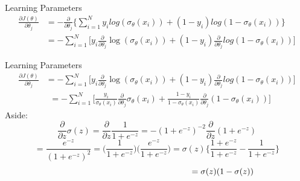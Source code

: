 \documentclass{beamer}
\begin{document}
\begin{frame}{Learning Parameters}
\begin{align*}
\frac{\partial J(\theta)}{\partial \theta_{j}} &= -\frac{\partial }{\partial \theta_{j}} \bigg\{\sum_{i=1}^{N} y_{i} log(\sigma_{\theta}(x_{i})) + (1 - y_{i})log(1 - \sigma_{\theta}(x_{i}))\bigg\} \\
&= -\sum_{i=1}^{N}\bigg[y_{i}\frac{\partial}{\partial \theta_{j}} \log(\sigma_{\theta}(x_{i})) + (1-y_{i})\frac{\partial}{\partial \theta_{j}} log(1 - \sigma_{\theta}(x_{i}))\bigg]
\end{align*}
\end{frame}
\begin{frame}{Learning Parameters}
\begin{align*}
\frac{\partial J(\theta)}{\partial \theta_{j}} &= -\sum_{i=1}^{N}\bigg[y_{i}\frac{\partial}{\partial \theta_{j}} \log(\sigma_{\theta}(x_{i})) + (1-y_{i})\frac{\partial}{\partial \theta_{j}} log(1 - \sigma_{\theta}(x_{i}))\bigg]
\end{align*}
\begin{align}
&= -\sum_{i=1}^{N}\bigg[\frac{y_{i}}{\sigma_{\theta}(x_{i})} \frac{\partial}{\partial \theta_{j}} \sigma_{\theta}(x_{i}) + \frac{1 - y_{i}}{1 - \sigma_{\theta}(x_{i})} \frac{\partial}{\partial \theta_{j}}(1 - \sigma_{\theta}(x_{i}))\bigg]
\end{align}
Aside:
\begin{equation*}
\frac{\partial}{\partial z}\sigma(z) = \frac{\partial}{\partial z}\frac{1}{1 + e^{-z}} = -(1 + e^{-z})^{-2}\frac{\partial}{\partial z}(1 + e^{-z})
\end{equation*}
\begin{equation*}
= \frac{e^{-z}}{(1 + e^{-z})^{2}} = \bigg(\frac{1}{1 + e^{-z}}\bigg)\bigg(\frac{e^{-z}}{1 + e^{-z}}\bigg) = \sigma(z)\bigg\{\frac{1 + e^{-z}}{1 + e^{-z}} - \frac{1}{1 + e^{-z}}\bigg\}
\end{equation*}
\begin{equation*}
\hspace{5.5cm}= \sigma(z)(1 - \sigma(z))
\end{equation*}
\end{frame}
\end{document}
